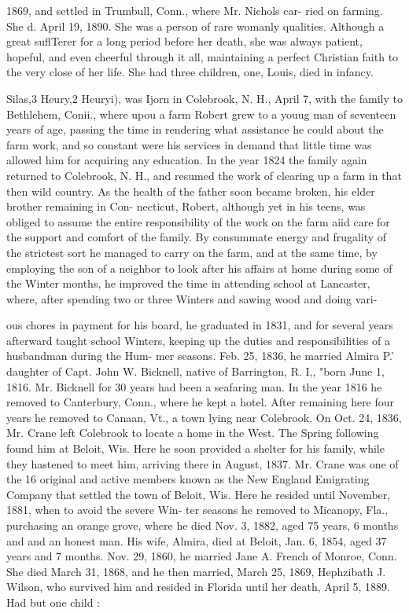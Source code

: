 \documentclass[oneside]{book}
\begin{document}
1869, and settled in Trumbull, Conn., where Mr. Nichols car- 
ried on farming. She d. April 19, 1890. She was a person of 
rare womanly qualities. Although a great suflTerer for a long 
period before her death, she was always patient, hopeful, and 
even cheerful through it all, maintaining a perfect Christian 
faith to the very close of her life. She had three children, 
one, Louis, died in infancy. 



Silas,3 Heury,2 Heuryi), was Ijorn in Colebrook, N. H., April 7, 
with the family to Bethlehem, Conii., where upou a farm Robert 
grew to a youug man of seventeen years of age, passing the time 
in rendering what assistance he could about the farm work, and 
so constant were his services in demand that little time was allowed 
him for acquiring any education. In the year 1824 the family 
again returned to Colebrook, N. H., and resumed the work of 
clearing up a farm in that then wild country. As the health of the 
father soon became broken, his elder brother remaining in Con- 
necticut, Robert, although yet in his teens, was obliged to assume 
the entire responsibility of the work on the farm aiid care for the 
support and comfort of the family. By consummate energy and 
frugality of the strictest sort he managed to carry on the farm, 
and at the same time, by employing the son of a neighbor to look 
after his affairs at home during some of the Winter months, he 
improved the time in attending school at Lancaster, where, after 
spending two or three Winters and sawing wood and doing vari- 




ous chores in payment for his board, he graduated in 1831, and 
for several years afterward taught school Winters, keeping up 
the duties and responsibilities of a husbandman during the Hum- 
mer seasons. Feb. 25, 1836, he married Almira P.' daughter 
of Capt. John W. Bicknell, native of Barrington, R. I,, "born 
June 1, 1816. Mr. Bicknell for 30 years had been a seafaring 
man. In the year 1816 he removed to Canterbury, Conn., 
where he kept a hotel. After remaining here four years he 
removed to Canaan, Vt., a town lying near Colebrook. On 
Oct. 24, 1836, Mr. Crane left Colebrook to locate a home in the 
West. The Spring following found him at Beloit, Wis. Here 
he soon provided a shelter for his family, while they hastened to 
meet him, arriving there in August, 1837. Mr. Crane was one 
of the 16 original and active members known as the New England 
Emigrating Company that settled the town of Beloit, Wis. Here 
he resided until November, 1881, when to avoid the severe Win- 
ter seasons he removed to Micanopy, Fla., purchasing an orange 
grove, where he died Nov. 3, 1882, aged 75 years, 6 months and 
and an honest man. His wife, Almira, died at Beloit, Jan. 6, 
1854, aged 37 years and 7 months. Nov. 29, 1860, he married 
Jane A. French of Monroe, Conn. She died March 31, 1868, 
and he then married, March 25, 1869, Hephzibath J. Wilson, 
who survived him and resided in Florida until her death, April 
5, 1889. Had but one child : 
\end{document}
